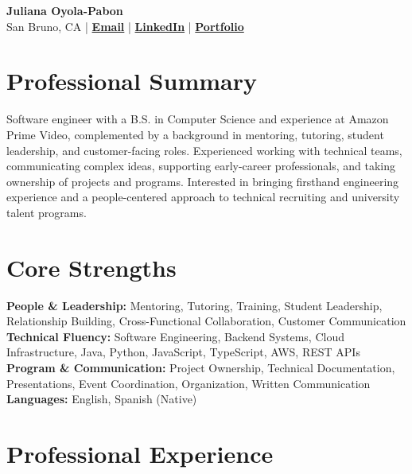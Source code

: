 \documentclass[10pt,letterpaper]{article}
\begin{document}
\begin{center}
{\LARGE\bfseries\color{Accent} Juliana Oyola-Pabon}\\[4pt]
San Bruno, CA
\enspace|\enspace
\href{mailto:julianaaoyola@gmail.com}{\textbf{Email}}
\enspace|\enspace
\href{https://linkedin.com/in/julianaoyola}{\textbf{LinkedIn}}
\enspace|\enspace
\href{https://juliana-portfolio-two.vercel.app/}{\textbf{Portfolio}}
\end{center}

\vspace{-2pt}

\section*{Professional Summary}

Software engineer with a B.S. in Computer Science and experience at Amazon
Prime Video, complemented by a background in mentoring, tutoring, student
leadership, and customer-facing roles. Experienced working with technical
teams, communicating complex ideas, supporting early-career professionals,
and taking ownership of projects and programs. Interested in bringing firsthand
engineering experience and a people-centered approach to technical recruiting
and university talent programs.

\section*{Core Strengths}

\textbf{People \& Leadership:}
Mentoring, Tutoring, Training, Student Leadership, Relationship Building,
Cross-Functional Collaboration, Customer Communication \\

\textbf{Technical Fluency:}
Software Engineering, Backend Systems, Cloud Infrastructure, Java, Python,
JavaScript, TypeScript, AWS, REST APIs \\

\textbf{Program \& Communication:}
Project Ownership, Technical Documentation, Presentations, Event Coordination,
Organization, Written Communication \\

\textbf{Languages:}
English, Spanish (Native)

\section*{Professional Experience}
\end{document}
